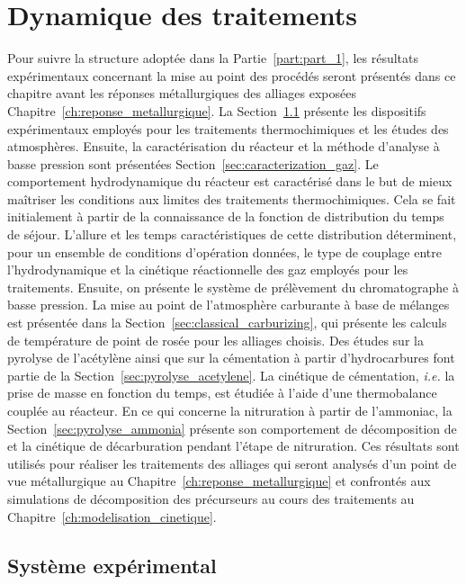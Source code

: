 \chapter{Dynamique des traitements}
\label{ch:caracterisation_atmospheres}

\vfill

Pour suivre la structure adoptée dans la Partie~\ref{part:part_1}, les résultats expérimentaux concernant la mise au point des procédés seront présentés dans ce chapitre avant les réponses métallurgiques des alliages exposées Chapitre~\ref{ch:reponse_metallurgique}. La Section~\ref{sec:experimental_system} présente les dispositifs expérimentaux employés pour les traitements thermochimiques et les études des atmosphères. Ensuite, la caractérisation du réacteur et la méthode d'analyse à basse pression sont présentées Section~\ref{sec:caracterization_gaz}. Le comportement hydrodynamique du réacteur est caractérisé dans le but de mieux maîtriser les conditions aux limites des traitements thermochimiques. Cela se fait initialement à partir de la connaissance de la fonction de distribution du temps de séjour. L'allure et les temps caractéristiques de cette distribution déterminent, pour un ensemble de conditions d'opération données, le type de couplage entre l'hydrodynamique et la cinétique réactionnelle des gaz employés pour les traitements. Ensuite, on présente le système de prélèvement du chromatographe à basse pression. La mise au point de l'atmosphère carburante à base de mélanges  est présentée dans la Section~\ref{sec:classical_carburizing}, qui présente les calculs de température de point de rosée pour les alliages choisis.  Des études sur la pyrolyse de l'acétylène ainsi que sur la cémentation à partir d'hydrocarbures font partie de la Section~\ref{sec:pyrolyse_acetylene}.  La cinétique de cémentation, \textit{i.e.} la prise de masse en fonction du temps, est étudiée à l'aide d'une thermobalance couplée au réacteur. En ce qui concerne la nitruration à partir de l'ammoniac, la Section~\ref{sec:pyrolyse_ammonia} présente son comportement de décomposition de  et la cinétique de décarburation pendant l'étape de nitruration. Ces résultats sont utilisés pour réaliser les traitements des alliages qui seront analysés d'un point de vue métallurgique au Chapitre~\ref{ch:reponse_metallurgique} et confrontés aux simulations de décomposition des précurseurs au cours des traitements au Chapitre~\ref{ch:modelisation_cinetique}.

\vfill\newpage

\section{Système expérimental}
\label{sec:experimental_system}


